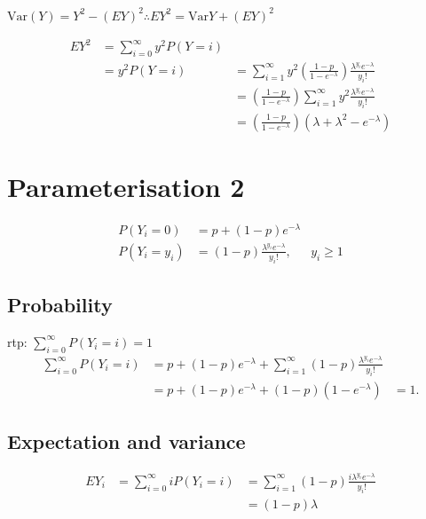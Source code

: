 \documentclass{amsart}
\def\Var{\text{Var}}
\begin{document}
$\Var(Y) = Y^2 - (EY)^2 \therefore E Y^2 = \Var Y + (E Y)^2$

\begin{equation*}
\begin{array}{lll}
E Y^2 &= \sum_{i=0}^{\infty} y^2 P(Y=i) & \\
&= y^2 P(Y=i) &= \sum_{i=1}^{\infty} y^2 \left( \frac{1 - p}{1 - e^{-\lambda}} \right) \frac{\lambda^{y_i} e^{-\lambda}}{y_i !} \\
&&= \left( \frac{1 - p}{1 - e^{-\lambda}} \right) \sum_{i=1}^{\infty}  y^2 \frac{\lambda^{y_i} e^{-\lambda}}{y_i !} \\
&&= \left( \frac{1 - p}{1 - e^{-\lambda}} \right) (\lambda + \lambda^2 - e^{-\lambda})
\end{array}
\end{equation*}

\section{Parameterisation 2}

\begin{equation*}
\begin{array}{lll}
P(Y_i = 0) &= p + (1 - p) e^{-\lambda} & \\
P(Y_i = y_i) &= (1 - p) \frac{\lambda^{y_i} e^{-\lambda}}{y_i !}, & y_i \geq 1
\end{array}
\end{equation*}

\subsection{Probability}

rtp: $\sum_{i=0}^{\infty} P(Y_i = i) = 1$
\begin{equation*}
\begin{array}{lll}
\sum_{i=0}^{\infty} P(Y_i = i) &= p + (1 - p) e^{-\lambda} + \sum_{i=1}^{\infty} (1 - p) \frac{\lambda^{y_i} e^{-\lambda}}{y_i !} \\
&= p + (1 - p) e^{-\lambda} + (1 - p) (1 - e^{-\lambda}) &= 1.
\end{array}
\end{equation*}

\subsection{Expectation and variance}

\begin{equation*}
\begin{array}{lll}
E Y_i &= \sum_{i=0}^{\infty} i P(Y_i = i) &= \sum_{i=1}^{\infty} (1 - p) \frac{i \lambda^{y_i} e^{-\lambda}}{y_i !} \\
&&= (1 - p) \lambda
\end{array}
\end{equation*}
\end{document}
